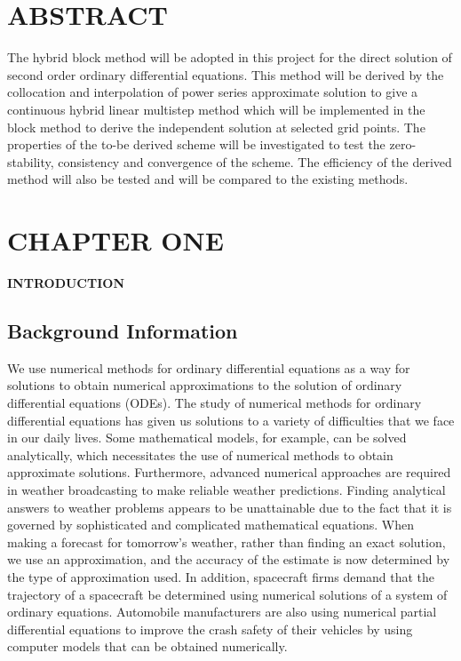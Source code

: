 \documentclass[12pt]{report}
\begin{document}

\chapter*{ABSTRACT}
%
\noindent The hybrid block method will be adopted in this project for the direct solution of second order ordinary differential equations. This method will be derived by the collocation and interpolation of power series approximate solution to give a continuous hybrid linear multistep method which will be implemented in the block method to derive the independent solution at selected grid points. The properties of the to-be derived scheme will be investigated to test the zero-stability, consistency and convergence of the scheme. The efficiency of the derived method will also be tested and will be compared to the existing methods.
\tableofcontents

%
%
\cleardoublepage
{}
\chapter[CHAPTER ONE: INTRODUCTION]{CHAPTER ONE}
\begin{center}
	\Large\textbf{INTRODUCTION}
\end{center}
\section{Background Information}
\noindent We use numerical methods for ordinary differential equations as a way for solutions to obtain numerical approximations to the solution of ordinary differential equations (ODEs). The study of numerical methods for ordinary differential equations has given us solutions to a variety of difficulties that we face in our daily lives. Some mathematical models, for example, can be solved analytically, which necessitates the use of numerical methods to obtain approximate solutions. Furthermore, advanced numerical approaches are required in weather broadcasting to make reliable weather predictions. Finding analytical answers to weather problems appears to be unattainable due to the fact that it is governed by sophisticated and complicated mathematical equations. When making a forecast for tomorrow's weather, rather than finding an exact solution, we use an approximation, and the accuracy of the estimate is now determined by the type of approximation used. In addition, spacecraft firms demand that the trajectory of a spacecraft be determined using numerical solutions of a system of ordinary equations. Automobile manufacturers are also using numerical partial differential equations to improve the crash safety of their vehicles by using computer models that can be obtained numerically.
\end{document}
